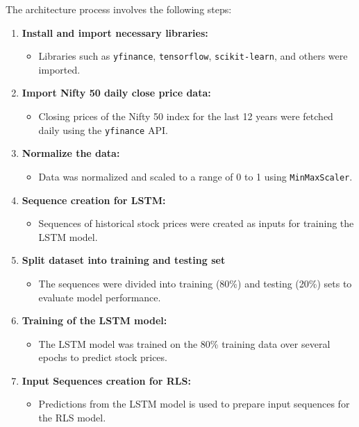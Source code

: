 The architecture process involves the following steps:

\begin{enumerate}
    \item \textbf{Install and import necessary libraries:}
    \begin{itemize}
        \item Libraries such as \texttt{yfinance}, \texttt{tensorflow}, \texttt{scikit-learn}, and others were imported.
    \end{itemize}
    
    \item \textbf{Import Nifty 50 daily close price data:}
    \begin{itemize}
        \item Closing prices of the Nifty 50 index for the last 12 years were fetched daily using the \texttt{yfinance} API.
    \end{itemize}
    
    \item \textbf{Normalize the data:}
    \begin{itemize}
        \item Data was normalized and scaled to a range of 0 to 1 using \texttt{MinMaxScaler}.
    \end{itemize}
    
    \item \textbf{Sequence creation for LSTM:}
    \begin{itemize}
        \item Sequences of historical stock prices were created as inputs for training the LSTM model.
    \end{itemize}
    
    \item \textbf{Split dataset into training and testing set}
    \begin{itemize}
        \item The sequences were divided into training (80\%) and testing (20\%) sets to evaluate model performance.
    \end{itemize}
    
    \item \textbf{Training of the LSTM model:}
    \begin{itemize}
        \item The LSTM model was trained on the 80\% training data over several epochs to predict stock prices.
    \end{itemize}
    
    \item \textbf{Input Sequences creation for RLS:}
    \begin{itemize}
        \item Predictions from the LSTM model is used to prepare input sequences for the RLS model.
    \end{itemize}
    

\end{enumerate}
